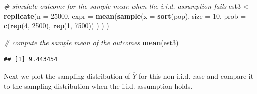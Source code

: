 \documentclass[]{book}
\newenvironment{Shaded}{\begin{snugshade}}{\end{snugshade}}
\newcommand{\KeywordTok}[1]{\textcolor[rgb]{0.13,0.29,0.53}{\textbf{#1}}}
\newcommand{\DataTypeTok}[1]{\textcolor[rgb]{0.13,0.29,0.53}{#1}}
\newcommand{\DecValTok}[1]{\textcolor[rgb]{0.00,0.00,0.81}{#1}}
\newcommand{\StringTok}[1]{\textcolor[rgb]{0.31,0.60,0.02}{#1}}
\newcommand{\CommentTok}[1]{\textcolor[rgb]{0.56,0.35,0.01}{\textit{#1}}}
\newcommand{\NormalTok}[1]{#1}
\theoremstyle{definition}
\theoremstyle{definition}
\theoremstyle{definition}
\theoremstyle{remark}
\begin{document}
\begin{Shaded}
\begin{Highlighting}[]
\CommentTok{# simulate outcome for the sample mean when the i.i.d. assumption fails}
\NormalTok{est3 <-}\StringTok{  }\KeywordTok{replicate}\NormalTok{(}\DataTypeTok{n =} \DecValTok{25000}\NormalTok{, }
                   \DataTypeTok{expr =} \KeywordTok{mean}\NormalTok{(}\KeywordTok{sample}\NormalTok{(}\DataTypeTok{x =} \KeywordTok{sort}\NormalTok{(pop), }
                                      \DataTypeTok{size =} \DecValTok{10}\NormalTok{, }
                                      \DataTypeTok{prob =} \KeywordTok{c}\NormalTok{(}\KeywordTok{rep}\NormalTok{(}\DecValTok{4}\NormalTok{, }\DecValTok{2500}\NormalTok{), }\KeywordTok{rep}\NormalTok{(}\DecValTok{1}\NormalTok{, }\DecValTok{7500}\NormalTok{))}
\NormalTok{                                      )}
\NormalTok{                          )}
\NormalTok{                   )}

\CommentTok{# compute the sample mean of the outcomes}
\KeywordTok{mean}\NormalTok{(est3)}
\end{Highlighting}
\end{Shaded}

\begin{verbatim}
## [1] 9.443454
\end{verbatim}

Next we plot the sampling distribution of \(\overline{Y}\) for this
non-i.i.d. case and compare it to the sampling distribution when the
i.i.d. assumption holds.
\end{document}
